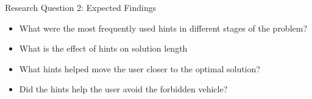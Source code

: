 \begin{frame}{Research Question 2: Expected Findings}
\begin{itemize}
\item What were the most frequently used hints in different stages of the problem?
\item What is the effect of hints on solution length
\item What hints helped move the user closer to the optimal solution?
\item Did the hints help the user avoid the forbidden vehicle?
\end{itemize}

\end{frame}